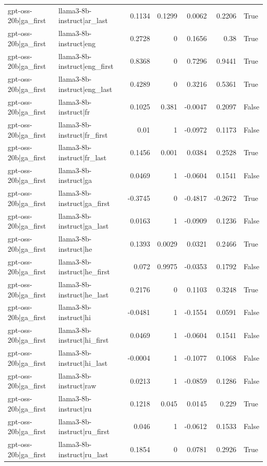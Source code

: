 \begin{table}
\begin{tabular}{l l r r r r l}
gpt-oss-20b|ga_first & llama3-8b-instruct|ar_last & 0.1134 & 0.1299 & 0.0062 & 0.2206 & True \\
gpt-oss-20b|ga_first & llama3-8b-instruct|eng & 0.2728 & 0 & 0.1656 & 0.38 & True \\
gpt-oss-20b|ga_first & llama3-8b-instruct|eng_first & 0.8368 & 0 & 0.7296 & 0.9441 & True \\
gpt-oss-20b|ga_first & llama3-8b-instruct|eng_last & 0.4289 & 0 & 0.3216 & 0.5361 & True \\
gpt-oss-20b|ga_first & llama3-8b-instruct|fr & 0.1025 & 0.381 & -0.0047 & 0.2097 & False \\
gpt-oss-20b|ga_first & llama3-8b-instruct|fr_first & 0.01 & 1 & -0.0972 & 0.1173 & False \\
gpt-oss-20b|ga_first & llama3-8b-instruct|fr_last & 0.1456 & 0.001 & 0.0384 & 0.2528 & True \\
gpt-oss-20b|ga_first & llama3-8b-instruct|ga & 0.0469 & 1 & -0.0604 & 0.1541 & False \\
gpt-oss-20b|ga_first & llama3-8b-instruct|ga_first & -0.3745 & 0 & -0.4817 & -0.2672 & True \\
gpt-oss-20b|ga_first & llama3-8b-instruct|ga_last & 0.0163 & 1 & -0.0909 & 0.1236 & False \\
gpt-oss-20b|ga_first & llama3-8b-instruct|he & 0.1393 & 0.0029 & 0.0321 & 0.2466 & True \\
gpt-oss-20b|ga_first & llama3-8b-instruct|he_first & 0.072 & 0.9975 & -0.0353 & 0.1792 & False \\
gpt-oss-20b|ga_first & llama3-8b-instruct|he_last & 0.2176 & 0 & 0.1103 & 0.3248 & True \\
gpt-oss-20b|ga_first & llama3-8b-instruct|hi & -0.0481 & 1 & -0.1554 & 0.0591 & False \\
gpt-oss-20b|ga_first & llama3-8b-instruct|hi_first & 0.0469 & 1 & -0.0604 & 0.1541 & False \\
gpt-oss-20b|ga_first & llama3-8b-instruct|hi_last & -0.0004 & 1 & -0.1077 & 0.1068 & False \\
gpt-oss-20b|ga_first & llama3-8b-instruct|raw & 0.0213 & 1 & -0.0859 & 0.1286 & False \\
gpt-oss-20b|ga_first & llama3-8b-instruct|ru & 0.1218 & 0.045 & 0.0145 & 0.229 & True \\
gpt-oss-20b|ga_first & llama3-8b-instruct|ru_first & 0.046 & 1 & -0.0612 & 0.1533 & False \\
gpt-oss-20b|ga_first & llama3-8b-instruct|ru_last & 0.1854 & 0 & 0.0781 & 0.2926 & True \\

\end{tabular}
\end{table}
